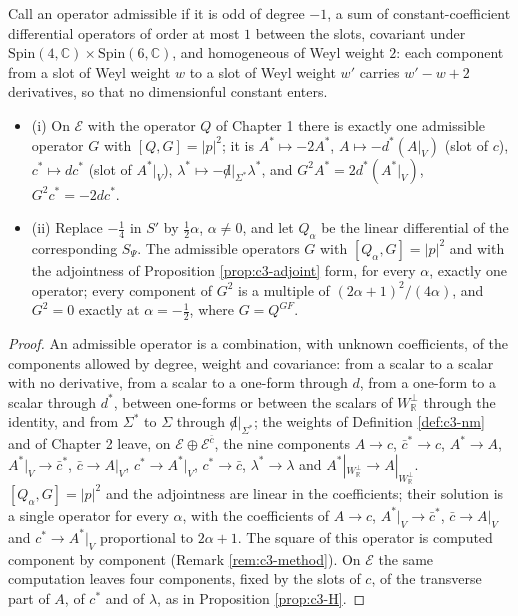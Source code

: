 \begin{theorem}
\label{thm:c3-unique}
Call an operator admissible if it is odd of degree $-1$, a sum of constant-coefficient differential operators of order at most $1$ between the slots, covariant under $\mathrm{Spin}(4,\mathbb C)\times\mathrm{Spin}(6,\mathbb C)$, and homogeneous of Weyl weight $2$: each component from a slot of Weyl weight $w$ to a slot of Weyl weight $w'$ carries $w'-w+2$ derivatives, so that no dimensionful constant enters.
\begin{itemize}
\item (i) On $\mathscr E$ with the operator $Q$ of Chapter 1 there is exactly one admissible operator $G$ with $[Q,G]=|p|^2$; it is $A^*\mapsto-2A^*$, $A\mapsto-d^*(A|_V)$ (slot of $c$), $c^*\mapsto dc^*$ (slot of $A^*|_V$), $\lambda^*\mapsto-{\not d}|_{\Sigma^*}\lambda^*$, and $G^2A^*=2d^*(A^*|_V)$, $G^2c^*=-2dc^*$.
\item (ii) Replace $-\tfrac14$ in $S'$ by $\tfrac12\alpha$, $\alpha\neq0$, and let $Q_\alpha$ be the linear differential of the corresponding $S_\Psi$. The admissible operators $G$ with $[Q_\alpha,G]=|p|^2$ and with the adjointness of Proposition \ref{prop:c3-adjoint} form, for every $\alpha$, exactly one operator; every component of $G^2$ is a multiple of $(2\alpha+1)^2/(4\alpha)$, and $G^2=0$ exactly at $\alpha=-\tfrac12$, where $G=Q^{GF}$.
\end{itemize}
\end{theorem}

\begin{proof}
An admissible operator is a combination, with unknown coefficients, of the components allowed by degree, weight and covariance: from a scalar to a scalar with no derivative, from a scalar to a one-form through $d$, from a one-form to a scalar through $d^*$, between one-forms or between the scalars of $W_{\mathbb R}^\perp$ through the identity, and from $\Sigma^*$ to $\Sigma$ through ${\not d}|_{\Sigma^*}$; the weights of Definition \ref{def:c3-nm} and of Chapter 2 leave, on $\mathscr E\oplus\mathscr E^{\bar c}$, the nine components $A\to c$, $\bar c^*\to c$, $A^*\to A$, $A^*|_V\to\bar c^*$, $\bar c\to A|_V$, $c^*\to A^*|_V$, $c^*\to\bar c$, $\lambda^*\to\lambda$ and $A^*|_{W_{\mathbb R}^\perp}\to A|_{W_{\mathbb R}^\perp}$. $[Q_\alpha,G]=|p|^2$ and the adjointness are linear in the coefficients; their solution is a single operator for every $\alpha$, with the coefficients of $A\to c$, $A^*|_V\to\bar c^*$, $\bar c\to A|_V$ and $c^*\to A^*|_V$ proportional to $2\alpha+1$. The square of this operator is computed component by component (Remark \ref{rem:c3-method}). On $\mathscr E$ the same computation leaves four components, fixed by the slots of $c$, of the transverse part of $A$, of $c^*$ and of $\lambda$, as in Proposition \ref{prop:c3-H}.
\end{proof}

